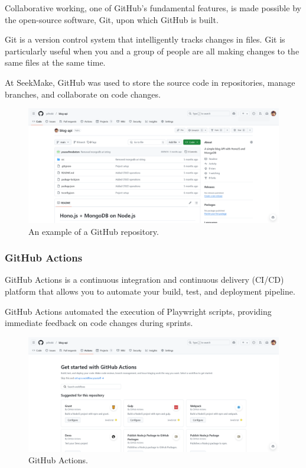 Collaborative working, one of GitHub’s fundamental features, is made possible by the open-source software, Git, upon which GitHub is built. \cite{github}

Git is a version control system that intelligently tracks changes in files. Git is particularly useful when you and a group of people are all making changes to the same files at the same time. \cite{github}


At SeekMake, GitHub was used to store the source code in repositories, manage branches, and collaborate on code changes.

\begin{figure}[H]
    \centering
    \includegraphics[width=\textwidth]{project/images/repo.png}
    \caption{An example of a GitHub repository.}
    \label{fig:github-repo}
\end{figure}
\subsubsection{GitHub Actions}
GitHub Actions is a continuous integration and continuous delivery (CI/CD) platform that allows you to automate your build, test, and deployment pipeline. \cite{ghactions}

GitHub Actions automated the execution of Playwright scripts, providing immediate feedback on code changes during sprints.

\begin{figure}[H]
    \centering
    \includegraphics[width=\textwidth]{project/images/actions.png}
    \caption{GitHub Actions.}
    \label{fig:github-actions}
\end{figure}

